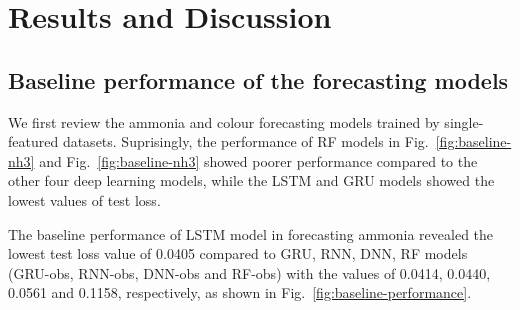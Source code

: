 \chapter{Results and Discussion}
\section{Baseline performance of the forecasting models}
We first review the ammonia and colour forecasting models trained by single-featured datasets. Suprisingly, the performance of RF models in Fig.~\ref{fig:baseline-nh3} and Fig.~\ref{fig:baseline-nh3} showed poorer performance compared to the other four deep learning models, while the LSTM and GRU models showed the lowest values of test loss. 


The baseline performance of LSTM model in forecasting ammonia revealed the lowest test loss value of 0.0405 compared to GRU, RNN, DNN, RF models (GRU-obs, RNN-obs, DNN-obs and RF-obs) with the values of 0.0414, 0.0440, 0.0561 and 0.1158, respectively, as shown in Fig.~\ref{fig:baseline-performance}.

